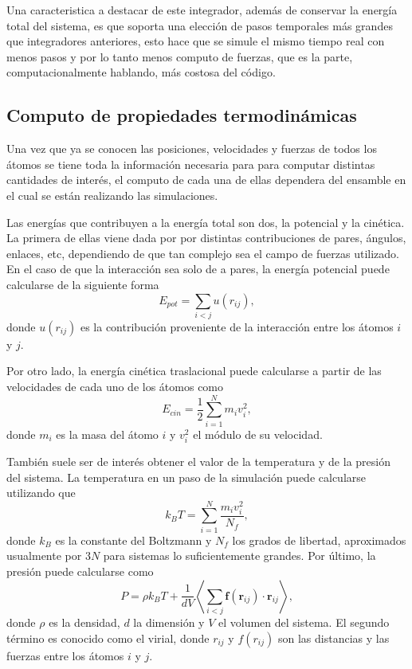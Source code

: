Una caracteristica a destacar de este integrador, además de conservar la energía
total del sistema, es que soporta una elección de pasos temporales más grandes
que integradores anteriores, esto hace que se simule el mismo tiempo real con 
menos pasos y por lo tanto menos computo de fuerzas, que es la parte, 
computacionalmente hablando, más costosa del código.

\subsection{Computo de propiedades termodinámicas}

Una vez que ya se conocen las posiciones, velocidades y fuerzas de todos los 
átomos se tiene toda la información necesaria para para computar distintas
cantidades de interés, el computo de cada una de ellas dependera del ensamble en
el cual se están realizando las simulaciones.

Las energías que contribuyen a la energía total son dos, la potencial y la
cinética. La primera de ellas viene dada por por distintas contribuciones de
pares, ángulos, enlaces, etc, dependiendo de que tan complejo sea el campo de 
fuerzas utilizado. En el caso de que la interacción sea solo de a pares, la
energía potencial puede calcularse de la siguiente forma
$$
E_{pot} = \sum_{i < j} u(r_{ij}),
$$
donde $u(r_{ij})$ es la contribución proveniente de la interacción entre los 
átomos $i$ y $j$.

Por otro lado, la energía cinética traslacional puede calcularse a partir de las
velocidades de cada uno de los átomos como
$$
E_{cin} = \frac{1}{2} \sum_{i=1}^{N} m_i v_i^2, 
$$
donde $m_i$ es la masa del átomo $i$ y $v_i^2$ el módulo de su velocidad. 

También suele ser de interés obtener el valor de la temperatura y de la presión
del sistema. La temperatura en un paso de la simulación puede calcularse 
utilizando que
$$
k_B T = \sum_{i=1}^N \frac{m_i v_i^2}{N_f},
$$
donde $k_B$ es la constante del Boltzmann y $N_f$ los grados de libertad,
aproximados usualmente por $3N$ para sistemas lo suficientemente grandes. Por 
último, la presión puede calcularse como 
$$
P = \rho k_B T + \frac{1}{d V} \left\langle \sum_{i<j} \mathbf{f}(\mathbf{r}_{ij}) 
                                              \cdot \mathbf{r}_{ij} \right\rangle,
$$
donde $\rho$ es la densidad, $d$ la dimensión y $V$ el volumen del sistema. El
segundo término es conocido como el virial, donde $r_{ij}$ y $f(r_{ij})$ son las 
distancias y las fuerzas entre los átomos $i$ y $j$.

